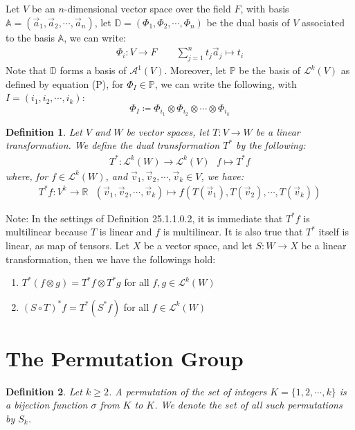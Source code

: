 \documentclass[11pt,oneside]{book}
\theoremstyle{break}
\theoremstyle{break}
\newtheorem{defn}{Definition}[corL]
\newcommand{\R}{\mathbb{R}}
\newcommand{\Lt}{\mathcal{L}}
\newcommand{\A}{\mathcal{A}}
\newcommand{\note}{\color{red}Note: \color{black}}
\begin{document}
Let $V$ be an $n$-dimensional vector space over the field $F$, with basis $\mathbb{A} = (\vec{a}_1,\vec{a}_2,\cdots, \vec{a}_n)$, let $\mathbb{D} = (\Phi_1,\Phi_2,\cdots,\Phi_n)$ be the dual basis of $V$ associated to the basis $\mathbb{A}$, we can write:
\begin{align*}
\Phi_i: V \to F \qquad \sum_{j=1}^n t_j\vec{a}_j \mapsto t_i
\end{align*}
Note that $\mathbb{D}$ forms a basis of $\A^1(V)$. Moreover, let $\mathbb{P}$ be the basis of $\Lt^k(V)$ as defined by equation (P), for $\Phi_I \in \mathbb{P}$, we can write the following, with $I = (i_1,i_2,\cdots, i_k)$: $$\Phi_I \coloneqq \Phi_{i_1}\otimes \Phi_{i_2}\otimes \cdots \otimes \Phi_{i_k}$$

\begin{defn}
Let $V$ and $W$ be vector spaces, let $T:V \to W$ be a linear transformation. We define the dual transformation $T^*$ by the following:
\begin{align*}
T^*:\Lt^k(W) \to \Lt^k(V) \ \ \ f\mapsto T^*f
\end{align*}
where, for $f \in \Lt^k(W)$, and $\vec{v}_1,\vec{v}_2,\cdots, \vec{v}_k \in V$, we have:
\begin{align*}
T^*f:V^k \to \R \ \ \ (\vec{v}_1,\vec{v}_2,\cdots, \vec{v}_k ) \mapsto f\left(T(\vec{v}_1),T(\vec{v}_2),\cdots, T(\vec{v}_k) \right) 
\end{align*}
\end{defn}

\note In the settings of Definition 25.1.1.0.2, it is immediate that $T^*f$ is multilinear because $T$ is linear and $f$ is multilinear. It is also true that $T^*$ itself is linear, as map of tensors. Let $X$ be a vector space, and let $S:W \to X$ be a linear transformation, then we have the followings hold:
\begin{enumerate}[topsep=3pt,itemsep=-1ex,partopsep=1ex,parsep=1ex]
\item $T^*(f\otimes g) = T^*f \otimes T^* g$ for all $f,g \in \Lt^k(W)$
\item $(S\circ T)^*f = T^*(S^*f)$ for all $f \in \Lt^k(W)$
\end{enumerate}

\newpage
\section[The Permutation Group]{\color{red}The Permutation Group \color{black}}
\begin{defn}
Let $k \geq 2$. A permutation of the set of integers $K= \{1 , 2,\cdots, k\}$ is a bijection function $\sigma$ from $K$ to $K$. We denote the set of all such permutations by $S_k$. 
\end{defn}
\end{document}
